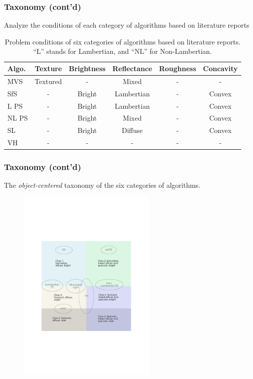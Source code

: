 \documentclass{beamer}
\begin{document}
\begin{frame}
\frametitle{Taxonomy (cont'd)}
Analyze the conditions of each category of algorithms based on literature reports
\begin{table}
\begin{tabular}{l|ccccc}
\toprule
Algo. & Texture & Brightness & Reflectance & Roughness & Concavity\\
\midrule
MVS & Textured & - & Mixed & - & -\\
SfS & - & Bright & Lambertian & - & Convex\\
L PS &  - & Bright & Lambertian & - & Convex\\
NL PS & - & Bright & Mixed & - & Convex\\
SL & - & Bright & Diffuse & - & Convex\\
VH & - & - & - & - & -\\
\bottomrule
\end{tabular}
\caption{Problem conditions of six categories of algorithms based on literature reports. ``L'' stands for Lambertian, and ``NL'' for Non-Lambertian.}
\end{table}

\end{frame}

\begin{frame}
\frametitle{Taxonomy (cont'd)}
The \textit{object-centered} taxonomy of the six categories of algorithms.
\begin{figure}[!htbp]
\includegraphics[width=0.6\textwidth]{taxo/six_class}
\end{figure}
\end{frame}
\end{document}
